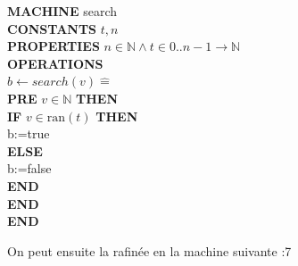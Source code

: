 \documentclass[10pt,a4paper]{article}
\newcommand{\Bequal}{\mathrel{\widehat{=}}}
\begin{document}
\iffalse
\noindent \textbf{MACHINE} search \\
\textbf{CONSTANTS} $t,n$ \\
\textbf{PROPERTIES} 
$n \in \mathbb{N} \wedge t \in 0..n-1 \rightarrow \mathbb{N}$ \\
\textbf{OPERATIONS} \\
$b \leftarrow search(v) \Bequal$ \\
\hspace*{1em}  \textbf{PRE} $v \in \mathbb{N}$ \textbf{THEN} \\
\hspace*{2em} \textbf{IF} $v \in \text{ran}(t)$ \textbf{THEN} \\
\hspace*{2em} b:=true \\
\hspace*{2em} \textbf{ELSE} \\
\hspace*{2em} b:=false \\
\hspace*{2em} \textbf{END} \\
\hspace*{1em} \textbf{END} \\
\textbf{END}

On peut ensuite la rafinée en la machine suivante :7
\end{document}
